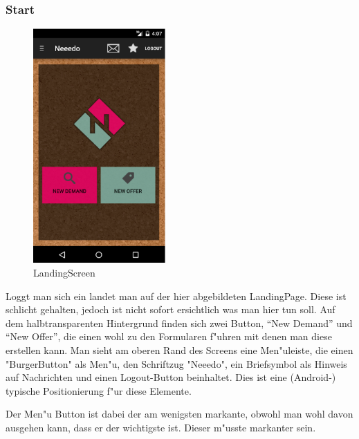 \subsubsection{Start}
\begin{figure}[h]
\begin{center}
\includegraphics[width=0.45\textwidth]{./Bilder/start.png}
\caption{LandingScreen}
\label{fig:start}
\end{center}
\end{figure}

Loggt man sich ein landet man auf der hier abgebildeten LandingPage. 
Diese ist schlicht gehalten, jedoch ist nicht sofort ersichtlich was man hier tun soll. 
Auf dem halbtransparenten Hintergrund finden sich zwei Button, \enquote{New Demand} und \enquote{New Offer}, die einen wohl zu den Formularen f"uhren mit denen man diese erstellen kann. 
Man sieht am oberen Rand des Screens eine Men"uleiste, die einen "BurgerButton" als Men"u, den Schriftzug "Neeedo", ein Briefsymbol als Hinweis auf Nachrichten und einen Logout-Button beinhaltet. 
Dies ist eine (Android-) typische Positionierung f"ur diese  Elemente. 

Der Men"u Button ist dabei der am wenigsten markante, obwohl man wohl davon ausgehen kann, dass er der wichtigste ist. 
Dieser m"usste markanter sein. 

